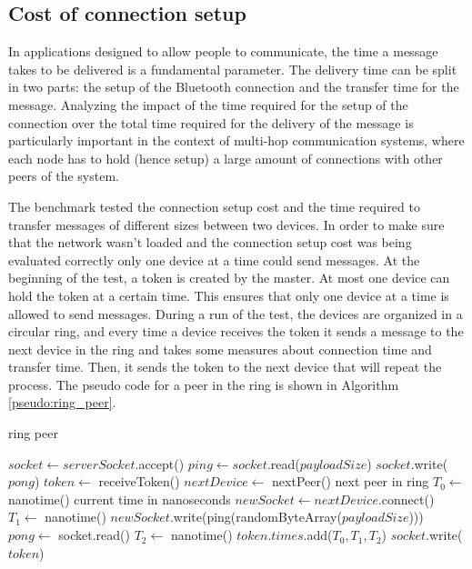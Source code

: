 \subsection{Cost of connection setup}
In applications designed to allow people to communicate, the time a message takes to be delivered is a fundamental parameter.
The delivery time can be split in two parts: the setup of the Bluetooth connection and the transfer time for the message.
Analyzing the impact of the time required for the setup of the connection over the total time required for the delivery of the message is particularly important in the context of multi-hop communication systems, where each node has to hold (hence setup) a large amount of connections with other peers of the system.

The benchmark tested the connection setup cost and the time required to transfer messages of different sizes between two devices.
In order to make sure that the network wasn't loaded and the connection setup cost was being evaluated correctly only one device at a time could send messages.
At the beginning of the test, a token is created by the master. At most one device can hold the token at a certain time. This ensures that only one device at a time is allowed to send messages.
During a run of the test, the devices are organized in a circular ring, and every time a device receives the token it sends a message to the next device in the ring and takes some measures about connection time and transfer time. Then, it sends the token to the next device that will repeat the process.
The pseudo code for a peer in the ring is shown in Algorithm \ref{pseudo:ring_peer}.

\begin{algorithm}
	\begin{algorithmic}[1]
  		\caption{ring peer}
  		\label{pseudo:ring_peer}
		\State $socket \leftarrow serverSocket$.accept()
		\State $ping \leftarrow socket$.read($payloadSize$)
		\State $socket$.write($pong$)
		\State $token \leftarrow$ receiveToken()
		\State $nextDevice \leftarrow$ nextPeer() \Comment next peer in ring
		\State $T_0 \leftarrow$ nanotime() \Comment current time in nanoseconds
		\State $newSocket \leftarrow nextDevice$.connect()
		\State $T_1 \leftarrow$ nanotime()
		\State $newSocket$.write(ping(randomByteArray($payloadSize$)))
		\State $pong \leftarrow$ socket.read()
		\State $T_2 \leftarrow$ nanotime()
		\State $token.times$.add($T_0, T_1, T_2$)
		\State $socket$.write($token$)
		\EndWhile
  	\end{algorithmic}
\end{algorithm}

